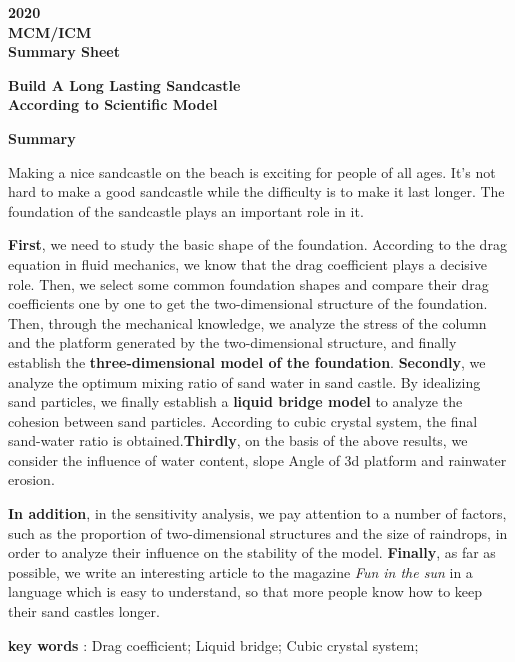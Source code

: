 \documentclass[13pt]{ctexart}
\begin{document}
	{ \centering
		\fontsize{14}{10}\selectfont\textbf{2020}\\
		\fontsize{10}{10}\selectfont\textbf{MCM/ICM}\\
		\fontsize{10}{10}\selectfont\textbf{Summary Sheet}\par
	}
	\vspace{10pt}
	{\centering
		\fontsize{18}{16}\selectfont\textbf{Build A Long Lasting Sandcastle}\\
		\fontsize{18}{16}\selectfont\textbf{According to Scientific Model}
		\vspace{10pt}
		
		\fontsize{13}{10}\selectfont\textbf{{Summary}}\par}
	
	\vspace{10pt}
	
	\fontsize{13}{13}\selectfont
	\thispagestyle{empty}
	\begin{adjustwidth}{2cm}{2cm}
		\indent { }{ }{ }{ }{ }{ }Making a nice sandcastle on the beach is exciting for people of all ages. It's not hard to make a good sandcastle while the difficulty is to make it last longer. The foundation of the sandcastle plays an important role in it.
		
		\textbf{First}, we need to study the basic shape of the foundation. According to the drag equation in fluid mechanics, we know that the drag coefficient plays a decisive role. Then, we select some common foundation shapes and compare their drag coefficients one by one to get the two-dimensional structure of the foundation. Then, through the mechanical knowledge, we analyze the stress of the column and the platform generated by the two-dimensional structure, and finally establish the \textbf{three-dimensional model of the foundation}.  \textbf{Secondly}, we analyze the optimum mixing ratio of sand water in sand castle. By idealizing sand particles, we finally establish a \textbf{liquid bridge model} to analyze the cohesion between sand particles. According to cubic crystal system, the final sand-water ratio is obtained.\textbf{Thirdly}, on the basis of the above results, we consider the influence of water content, slope Angle of 3d platform and rainwater erosion.
		
		\textbf{In addition}, in the sensitivity analysis, we pay attention to a number of factors, such as the proportion of two-dimensional structures and the size of raindrops, in order to analyze their influence on the stability of the model. \textbf{Finally}, as far as possible, we write an interesting article to the magazine \textit{Fun in the sun} in a language which is easy to understand, so that more people know how to keep their sand castles longer.
		
		\vspace{15pt}
		\textbf{key words} : Drag coefficient; Liquid bridge; Cubic crystal system;
	\end{adjustwidth}
	
\end{document}
